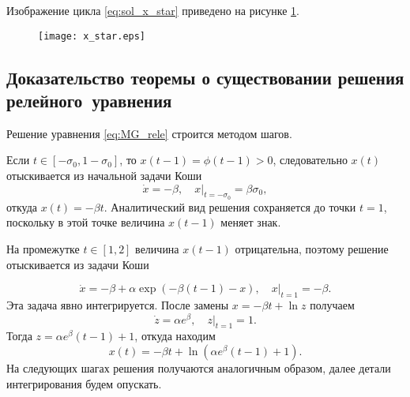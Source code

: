 Изображение цикла \eqref{eq:sol_x_star} приведено на рисунке \ref{fig:x_star:ch1}.

\begin{figure}
\centering
  \texttt{[image: x\_star.eps]}
  \label{fig:x_star:ch1}
\end{figure}


\subsection{Доказательство теоремы о существовании решения релейного~уравнения}

Решение уравнения \eqref{eq:MG_rele} строится методом шагов.

Если $t \in [-\sigma_0, 1 - \sigma_0]$, то $x(t - 1) = \phi(t - 1) > 0$, следовательно $x(t)$ отыскивается из начальной задачи Коши
\begin{equation}
    \dot{x} = -\beta, \quad x|_{t = -\sigma_0} = \beta \sigma_0,
\end{equation}
откуда $x(t) = -\beta t$. Аналитический вид решения сохраняется до точки $t = 1$, поскольку в этой точке величина $x(t - 1)$ меняет знак.

На промежутке $t \in [1, 2]$ величина $x(t - 1)$ отрицательна, поэтому решение отыскивается из задачи Коши

\begin{equation}
    \dot{x} = -\beta + \alpha\exp(-\beta(t - 1) - x), \quad x|_{t = 1} = -\beta.
\end{equation}
%
Эта задача явно интегрируется. После замены $x = -\beta t + \ln z$ получаем
\begin{equation*}
	\dot{z} = \alpha e^{\beta}, \quad z|_{t = 1} = 1.
\end{equation*}
%
Тогда $z = \alpha e^{\beta} (t - 1) + 1$, откуда находим
\begin{equation}
\label{eq:solution_step1:ch1}
	x(t) = -\beta t +\ln(\alpha e^{\beta}(t - 1) + 1).
\end{equation}
%
На следующих шагах решения получаются аналогичным образом, далее детали интегрирования будем опускать.


